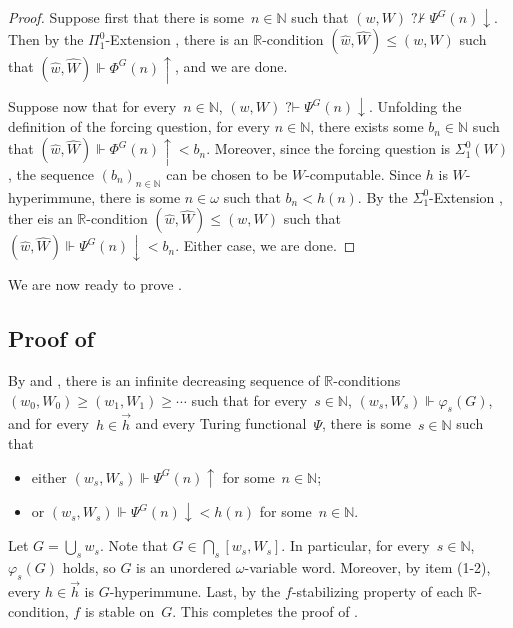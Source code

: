 \documentclass{article}
\def\h{\hat}
\def\forces{\Vdash}
\def\RR{\mathbb{R}}
\newcommand{\qvdash}{\operatorname{{?}{\vdash}}}
\newcommand{\nqvdash}{\operatorname{{?}{\nvdash}}}
\newcommand{\NN}[0]{\mathbb{N}}
\numberwithin{theorem}{section}
\newtheorem{lemma}[theorem]{Lemma}
\theoremstyle{definition}
\begin{document}
\begin{proof}
Suppose first that there is some~$n \in \NN$ such that $(w, W) \nqvdash \Psi^G(n)\downarrow$.
Then by the $\Pi^0_1$-Extension , there is an $\RR$-condition $(\hat w, \hat W) \leq (w, W)$ such that $(\hat w, \hat W) \Vdash \Phi^G(n)\uparrow$, and we are done.

Suppose now that for every~$n \in \NN$, $(w, W) \qvdash \Psi^G(n)\downarrow$.
Unfolding the definition of the forcing question, for every $n \in \NN$,
there exists some $b_n\in\NN$ such that $(\hat w, \hat W) \Vdash \Phi^G(n)\uparrow < b_n$.
Moreover, since the forcing question is $\Sigma^0_1(W)$, the sequence $(b_n)_{n\in\NN}$ can be chosen to be
$W$-computable. Since $h$ is $W$-hyperimmune, there is some $n\in\omega$ such that $b_n<h(n)$.
By the $\Sigma^0_1$-Extension ,
ther eis an $\RR$-condition $(\hat w, \hat W) \leq (w, W)$ such that $(\hat w, \hat W) \Vdash \Psi^G(n)\downarrow<b_n$.
Either case, we are done.
\end{proof}

We are now ready to prove .

\subsection{Proof of }

By  and ,
there is an infinite decreasing sequence of $\RR$-conditions
$(w_0, W_0) \geq (w_1, W_1) \geq \cdots$
such that for every~$s \in \NN$, $(w_s, W_s) \Vdash \varphi_s(G)$, and for every~$h \in \vec{h}$ and every Turing functional~$\Psi$, there is some~$s \in \NN$ such that
\begin{itemize}
    \item[(1)] either $(w_s, W_s) \Vdash \Psi^G(n)\uparrow$ for some~$n \in \NN$;
    \item[(2)] or $(w_s, W_s) \Vdash \Psi^G(n)\downarrow < h(n)$ for some~$n \in \NN$.
\end{itemize}
Let $G = \bigcup_s w_s$. Note that $G \in \bigcap_s [w_s, W_s]$.
In particular, for every~$s \in \NN$, $\varphi_s(G)$ holds, so $G$ is an unordered $\omega$-variable word.
Moreover, by item (1-2), every $h \in \vec{h}$ is $G$-hyperimmune.
Last, by the $f$-stabilizing property of each $\RR$-condition, $f$ is stable on~$G$. This completes the proof of .
\end{document}
